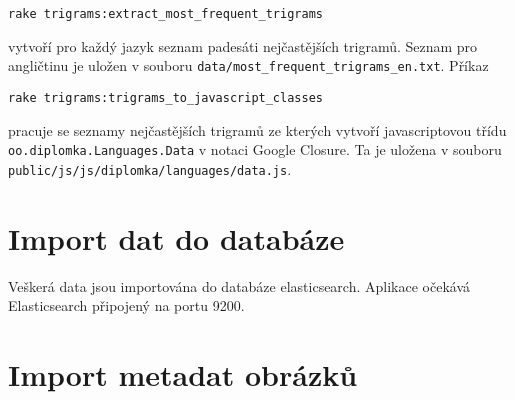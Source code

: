 \begin{lstlisting}
rake trigrams:extract_most_frequent_trigrams
\end{lstlisting}

vytvoří pro každý jazyk seznam padesáti nejčastějších trigramů. Seznam pro angličtinu je uložen v souboru \lstinline{data/most_frequent_trigrams_en.txt}. Příkaz

\begin{lstlisting}
rake trigrams:trigrams_to_javascript_classes
\end{lstlisting}

pracuje se seznamy nejčastějších trigramů ze kterých vytvoří javascriptovou třídu \lstinline{oo.diplomka.Languages.Data} v notaci Google Closure. Ta je uložena v souboru \lstinline{public/js/js/diplomka/languages/data.js}.

\section{Import dat do databáze}

Veškerá data jsou importována do databáze elasticsearch. Aplikace očekává Elasticsearch připojený na portu 9200.

\section{Import metadat obrázků}




